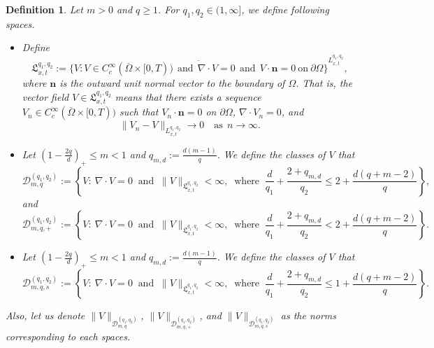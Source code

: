 \documentclass{amsart}
\newtheorem{defn}{Definition}[section]
\numberwithin{equation}{section}
\begin{document}
\begin{defn}\label{D:Serrin_divfree} 
Let $m>0$ and $q\geq 1$. For $q_1, q_2 \in (1, \infty]$, we define following spaces. 
\begin{itemize}

\item[(i)] Define 
\[
\mathfrak{L}_{x,t}^{q_1, q_2}:= \overline{\{V : V \in C_c^\infty(\overline{\Omega} \times[0, T))~~\mbox{and}~~ \nabla\cdot V = 0 ~~\mbox{and}~~ V\cdot \textbf{n} = 0 ~ \mbox{on} ~ \partial \Omega\}}^{L_{x,t}^{q_1, q_2}},
\]
where $\textbf{n}$ is the outward unit normal vector to the boundary of $\Omega$.
That is, the vector field $ V \in \mathfrak{L}_{x,t}^{q_1, q_2}$ means that there exists a sequence $V_n  \in C_c^\infty(\overline{\Omega} \times[0, T)) $ such that
$ V_n\cdot \textbf{n} = 0$ on $\partial \Omega$, $\nabla \cdot V_n =0$, and
\[
\|V_n-V \|_{L_{x,t}^{q_1, q_2}} \rightarrow 0 \quad \mbox{as} ~~ n \rightarrow \infty.
\]


\item[(ii)] Let $(1-\frac{2q}{d})_{+} \leq m < 1$ and $q_{m,d} := \frac{d(m-1)}{q}$. We define the classes of $V$ that 
\begin{equation*}\label{Vclass:compact}
	 \mathcal{D}_{m,q}^{(q_1,q_2)}:= \left\{V: \ \nabla \cdot V = 0 \ \text{ and } \ \|V\|_{\mathfrak{L}_{x,t}^{q_1,q_2}} < \infty, \ \text{ where }\ \frac{d}{q_1} + \frac{2 + q_{m,d}}{q_2} \leq 2+ \frac{d(q+m-2)}{q}\right\},
\end{equation*}
and
\begin{equation*}\label{Vsubclass:compact+}
	 \mathcal{D}_{m,q,+}^{(q_1,q_2)}:= \left\{V: \ \nabla \cdot V = 0 \ \text{ and } \ \|V\|_{\mathfrak{L}_{x,t}^{q_1,q_2}} < \infty, \ \text{ where }\ \frac{d}{q_1} + \frac{2 + q_{m,d}}{q_2} <  2+ \frac{d(q+m-2)}{q}\right\}.
\end{equation*}


\item[(iii)] Let $(1-\frac{2q}{d})_{+} \leq m < 1$ and $q_{m,d} := \frac{d(m-1)}{q}$. We define the classes of $V$ that
\begin{equation*}\label{Vclass:Speed}
	 \mathcal{D}_{m,q,s}^{(q_1,q_2)}:= \left\{V: \ \nabla \cdot V = 0 \ \text{ and } \ \|V\|_{\mathfrak{L}_{x,t}^{q_1,q_2}} < \infty, \ \text{ where }\ \frac{d}{q_1} + \frac{2 + q_{m,d}}{q_2} \leq  1+ \frac{d(q+m-2)}{q}\right\}.
\end{equation*}
\end{itemize}

Also, let us denote  $\|V\|_{\mathcal{D}_{m,q}^{(q_1, q_2)}}$, $\|V\|_{\mathcal{D}_{m,q,+}^{(q_1, q_2)}}$, and $\|V\|_{\mathcal{D}_{m,q, s}^{(q_1, q_2)}}$ as the norms corresponding to each spaces.
\end{defn}
\end{document}
